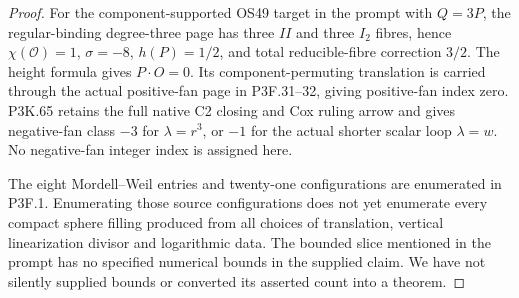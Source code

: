 \begin{proof}
For the component-supported OS49 target in the prompt with \(Q=3P\), the regular-binding degree-three page has three \(II\) and three \(I_2\) fibres, hence \(\chi(\mathcal O)=1\), \(\sigma=-8\), \(h(P)=1/2\), and total reducible-fibre correction \(3/2\). The height formula gives \(P\cdot O=0\). Its component-permuting translation is carried through the actual positive-fan page in P3F.31--32, giving positive-fan index zero. P3K.65 retains the full native C2 closing and Cox ruling arrow and gives negative-fan class \(-3\) for \(\lambda=r^3\), or \(-1\) for the actual shorter scalar loop \(\lambda=w\). No negative-fan integer index is assigned here.

The eight Mordell--Weil entries and twenty-one configurations are enumerated in P3F.1. Enumerating those source configurations does not yet enumerate every compact sphere filling produced from all choices of translation, vertical linearization divisor and logarithmic data. The bounded slice mentioned in the prompt has no specified numerical bounds in the supplied claim. We have not silently supplied bounds or converted its asserted count into a theorem.
\end{proof}
